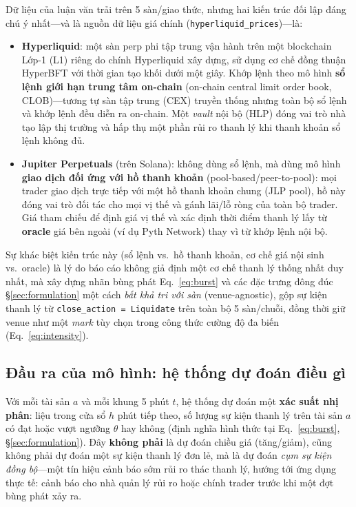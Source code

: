\documentclass[11pt,a4paper]{article}
\begin{document}
Dữ liệu của luận văn trải trên 5 sàn/giao thức, nhưng hai kiến trúc đối lập đáng chú ý nhất---và là nguồn dữ liệu giá chính (\texttt{hyperliquid\_prices})---là:

\begin{itemize}[nosep]
    \item \textbf{Hyperliquid}: một sàn perp phi tập trung vận hành trên một blockchain Lớp-1 (L1) riêng do chính Hyperliquid xây dựng, sử dụng cơ chế đồng thuận HyperBFT với thời gian tạo khối dưới một giây. Khớp lệnh theo mô hình \textbf{sổ lệnh giới hạn trung tâm on-chain} (on-chain central limit order book, CLOB)---tương tự sàn tập trung (CEX) truyền thống nhưng toàn bộ sổ lệnh và khớp lệnh đều diễn ra on-chain. Một \emph{vault} nội bộ (HLP) đóng vai trò nhà tạo lập thị trường và hấp thụ một phần rủi ro thanh lý khi thanh khoản sổ lệnh không đủ.
    \item \textbf{Jupiter Perpetuals} (trên Solana): không dùng sổ lệnh, mà dùng mô hình \textbf{giao dịch đối ứng với hồ thanh khoản} (pool-based/peer-to-pool): mọi trader giao dịch trực tiếp với một hồ thanh khoản chung (JLP pool), hồ này đóng vai trò đối tác cho mọi vị thế và gánh lãi/lỗ ròng của toàn bộ trader. Giá tham chiếu để định giá vị thế và xác định thời điểm thanh lý lấy từ \textbf{oracle} giá bên ngoài (ví dụ Pyth Network) thay vì từ khớp lệnh nội bộ.
\end{itemize}

Sự khác biệt kiến trúc này (sổ lệnh vs.\ hồ thanh khoản, cơ chế giá nội sinh vs.\ oracle) là lý do báo cáo không giả định một cơ chế thanh lý thống nhất duy nhất, mà xây dựng nhãn bùng phát Eq.~\eqref{eq:burst} và các đặc trưng đông đúc \S\ref{sec:formulation} một cách \emph{bất khả tri với sàn} (venue-agnostic), gộp sự kiện thanh lý từ \texttt{close\_action = Liquidate} trên toàn bộ 5 sàn/chuỗi, đồng thời giữ venue như một \emph{mark} tùy chọn trong công thức cường độ đa biến (Eq.~\eqref{eq:intensity}).

\subsection{Đầu ra của mô hình: hệ thống dự đoán điều gì}

Với mỗi tài sản $a$ và mỗi khung 5 phút $t$, hệ thống dự đoán một \textbf{xác suất nhị phân}: liệu trong cửa sổ $h$ phút tiếp theo, số lượng sự kiện thanh lý trên tài sản $a$ có đạt hoặc vượt ngưỡng $\theta$ hay không (định nghĩa hình thức tại Eq.~\eqref{eq:burst}, \S\ref{sec:formulation}). Đây \textbf{không phải} là dự đoán chiều giá (tăng/giảm), cũng không phải dự đoán một sự kiện thanh lý đơn lẻ, mà là dự đoán \emph{cụm sự kiện đồng bộ}---một tín hiệu cảnh báo sớm rủi ro thác thanh lý, hướng tới ứng dụng thực tế: cảnh báo cho nhà quản lý rủi ro hoặc chính trader trước khi một đợt bùng phát xảy ra.
\end{document}
